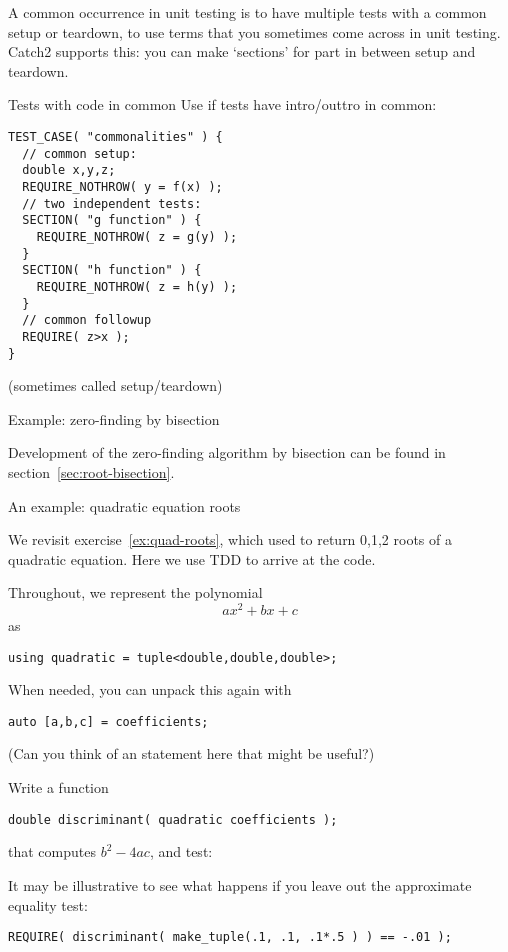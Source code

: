 A common occurrence in unit testing is to have
multiple tests with a common setup or teardown,
to use terms that you sometimes come across in unit testing.
Catch2 supports this:
you can make `sections' for part in between setup and teardown.

\begin{block}{Tests with code in common}
\label{sl:catch-section}
Use  if tests have intro/outtro in common:
\begin{lstlisting}
TEST_CASE( "commonalities" ) {
  // common setup:
  double x,y,z;
  REQUIRE_NOTHROW( y = f(x) );
  // two independent tests:
  SECTION( "g function" ) {
    REQUIRE_NOTHROW( z = g(y) );
  }
  SECTION( "h function" ) {
    REQUIRE_NOTHROW( z = h(y) );
  }
  // common followup
  REQUIRE( z>x );
}
\end{lstlisting}
(sometimes called setup/teardown)
\end{block}

 {Example: zero-finding by bisection}

Development of the zero-finding algorithm by bisection
can be found in section~\ref{sec:root-bisection}.

 {An example: quadratic equation roots}
\label{sec:quad-tdd}

We revisit exercise~\ref{ex:quad-roots},
which used 
to return 0,1,2 roots of a quadratic equation.
Here we use \ac{TDD} to arrive at the code.

Throughout, we represent the polynomial
\[ ax^2+bx+c \]
as 
\begin{lstlisting}
using quadratic = tuple<double,double,double>;  
\end{lstlisting}
When needed, you can unpack this again with
\begin{lstlisting}
auto [a,b,c] = coefficients;  
\end{lstlisting}
(Can you think of an  statement here
that might be useful?)

\begin{exercise}
  \label{ex:qdisc}
  Write a function
\begin{lstlisting}
double discriminant( quadratic coefficients );
\end{lstlisting}
that computes $b^2-4ac$, and test:
\end{exercise}

It may be illustrative to see what happens if you leave out the
approximate equality test:
\begin{lstlisting}
REQUIRE( discriminant( make_tuple(.1, .1, .1*.5 ) ) == -.01 );
\end{lstlisting}

